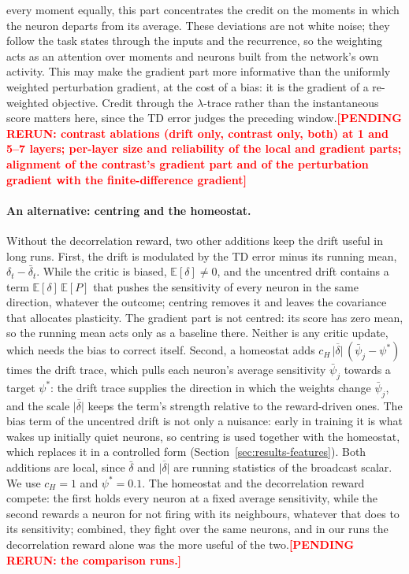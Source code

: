\documentclass[10pt,twocolumn]{article}
\newcommand{\pending}[1]{\textcolor{red}{\bfseries[PENDING RERUN#1]}}
\begin{document}
every moment equally, this part concentrates the credit on the moments in which the
neuron departs from its average. These deviations are not white noise; they follow the
task states through the inputs and the recurrence, so the weighting acts as an
attention over moments and neurons built from the network's own activity. This may
make the gradient part more informative than the uniformly weighted perturbation
gradient, at the cost of a bias: it is the gradient of a re-weighted objective.
Credit through the $\lambda$-trace rather than the instantaneous score
matters here, since the TD error judges the preceding window.\pending{: contrast
ablations (drift only, contrast only, both) at 1 and 5--7 layers; per-layer size and
reliability of the local and gradient parts; alignment of the contrast's gradient part
and of the perturbation gradient with the finite-difference gradient}

\paragraph{An alternative: centring and the homeostat.}
Without the decorrelation reward, two other additions keep the drift useful in long
runs. First, the drift is modulated by the
TD error minus its running mean, $\delta_t-\bar\delta_t$. While the critic is biased,
$\mathbb{E}[\delta]\neq0$, and the uncentred drift contains a term
$\mathbb{E}[\delta]\,\mathbb{E}[P]$ that pushes the sensitivity of every neuron in the
same direction, whatever the outcome; centring removes it and leaves the covariance
that allocates plasticity. The gradient part is not centred: its score has zero mean,
so the running mean acts only as a baseline there. Neither is any critic update, which
needs the bias to correct itself. Second, a homeostat adds
$c_H\,\overline{|\delta|}\,(\bar\psi_j-\psi^*)$ times the drift trace, which pulls each
neuron's average sensitivity $\bar\psi_j$ towards a target $\psi^*$: the drift trace
supplies the direction in which the weights change $\bar\psi_j$, and the scale
$\overline{|\delta|}$ keeps the term's strength relative to the reward-driven ones. The
bias term of the uncentred drift is not only a nuisance: early in training it is what
wakes up initially quiet neurons, so centring is used together with the homeostat,
which replaces it in a controlled form (Section~\ref{sec:results-features}). Both
additions are local, since $\bar\delta$ and $\overline{|\delta|}$ are running
statistics of the broadcast scalar. We use $c_H=1$ and $\psi^*=0.1$. The homeostat and
the decorrelation reward compete: the first holds every neuron at a fixed average
sensitivity, while the second rewards a neuron for not firing with its neighbours,
whatever that does to its sensitivity; combined, they fight over the same neurons, and in our
runs the decorrelation reward alone was the more useful of the two.\pending{: the
comparison runs.}
\end{document}

